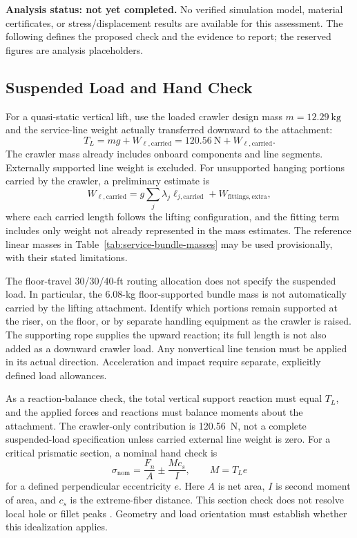 \textbf{Analysis status: not yet completed.} No verified simulation model, material certificates, or stress/displacement results are available for this assessment. The following defines the proposed check and the evidence to report; the reserved figures are analysis placeholders.

\subsection{Suspended Load and Hand Check}
\label{sec:suspended-load}
For a quasi-static vertical lift, use the loaded crawler design mass $m=12.29~\mathrm{kg}$ and the service-line weight actually transferred downward to the attachment:
\begin{equation}
 T_L=mg+W_{\ell,\mathrm{carried}}
     =120.56~\mathrm{N}+W_{\ell,\mathrm{carried}}.
 \label{eq:retrieval-lift-load}
\end{equation}
The crawler mass already includes onboard components and line segments. Externally supported line weight is excluded. For unsupported hanging portions carried by the crawler, a preliminary estimate is
\begin{equation}
 W_{\ell,\mathrm{carried}}
 =g\sum_j\lambda_j\ell_{j,\mathrm{carried}}+W_{\mathrm{fittings,extra}},
 \label{eq:carried-line-weight}
\end{equation}
where each carried length follows the lifting configuration, and the fitting term includes only weight not already represented in the mass estimates. The reference linear masses in Table~\ref{tab:service-bundle-masses} may be used provisionally, with their stated limitations.

The floor-travel 30/30/40-ft routing allocation does not specify the suspended load. In particular, the 6.08-kg floor-supported bundle mass is not automatically carried by the lifting attachment. Identify which portions remain supported at the riser, on the floor, or by separate handling equipment as the crawler is raised. The supporting rope supplies the upward reaction; its full length is not also added as a downward crawler load. Any nonvertical line tension must be applied in its actual direction. Acceleration and impact require separate, explicitly defined load allowances.

As a reaction-balance check, the total vertical support reaction must equal $T_L$, and the applied forces and reactions must balance moments about the attachment. The crawler-only contribution is 120.56~N, not a complete suspended-load specification unless carried external line weight is zero. For a critical prismatic section, a nominal hand check is
\begin{equation}
 \sigma_{\mathrm{nom}}=\frac{F_n}{A}\pm\frac{Mc_s}{I},
 \qquad M=T_L e
 \label{eq:attachment-hand-check}
\end{equation}
for a defined perpendicular eccentricity $e$. Here $A$ is net area, $I$ is second moment of area, and $c_s$ is the extreme-fiber distance. This section check does not resolve local hole or fillet peaks \citep{ansysStressSingularity}. Geometry and load orientation must establish whether this idealization applies.

